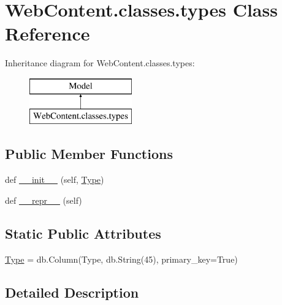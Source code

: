 \hypertarget{class_web_content_1_1classes_1_1types}{}\section{Web\+Content.\+classes.\+types Class Reference}
\label{class_web_content_1_1classes_1_1types}
Inheritance diagram for Web\+Content.\+classes.\+types\+:\begin{figure}[H]
\begin{center}
\leavevmode
\includegraphics[height=2.000000cm]{class_web_content_1_1classes_1_1types}
\end{center}
\end{figure}
\subsection*{Public Member Functions}
\begin{DoxyCompactItemize}
\item 
def \hyperlink{class_web_content_1_1classes_1_1types_a87e09373df434b5bd47377d8399af113}{\+\_\+\+\_\+init\+\_\+\+\_\+} (self, \hyperlink{class_web_content_1_1classes_1_1types_a14ba7df18201fb701b0408d06bc4c058}{Type})
\item 
def \hyperlink{class_web_content_1_1classes_1_1types_ad63c238527b3bf635f67442625dc976e}{\+\_\+\+\_\+repr\+\_\+\+\_\+} (self)
\end{DoxyCompactItemize}
\subsection*{Static Public Attributes}
\begin{DoxyCompactItemize}
\item 
\hyperlink{class_web_content_1_1classes_1_1types_a14ba7df18201fb701b0408d06bc4c058}{Type} = db.\+Column(\textquotesingle{}Type\textquotesingle{}, db.\+String(45), primary\+\_\+key=True)
\end{DoxyCompactItemize}


\subsection{Detailed Description}


